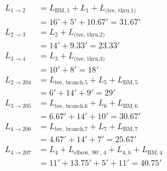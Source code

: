 \begin{align*}
    L_{1\to2} &= L_{\text{BM}, 1} + L_{1} + L_{\text{(tee, thru,} 1)} \\
    &= 16' + 5' + 10.67' = 31.67' \\
    L_{2\to3} &= L_{2} + L_{\text{(tee, thru,} 2)} \\
    &= 14' + 9.33' = 23.33' \\
    L_{3\to4} &= L_{3} + L_{\text{(tee, thru,} 3)} \\
    &= 10' + 8' = 18' \\
    L_{2\to204} &= L_{\text{tee, branch,}5} + L_{5} + L_{\text{BM}, 5} \\
    &= 6' + 14' + 9' = 29' \\
    L_{3\to205} &= L_{\text{tee, branch,}6} + L_{6} + L_{\text{BM}, 6} \\
    &= 6.67' + 14' + 10' = 30.67' \\
    L_{4\to206} &= L_{\text{tee, branch,}7} + L_{7} + L_{\text{BM}, 7} \\
    &= 4.67' + 14' + 7' = 25.67' \\
    L_{4\to207} &= L_{4} + L_{\text{elbow, 90$^\circ$, 4}} + L_{4,h} + L_{\text{BM}, 4} \\
    &= 11' + 13.75' + 5' + 11' = 40.75' \\
\end{align*}
